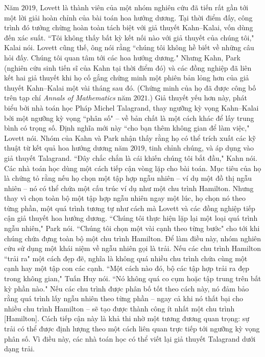 \begin{multicols}{2}
	\vskip 0.1cm
	Năm $2019$, Lovett là thành viên của một nhóm nghiên cứu đã tiến rất gần tới một lời giải hoàn chỉnh của bài toán hoa hướng dương. Tại thời điểm đấy, công trình đó tưởng chừng hoàn toàn tách biệt với giả thuyết Kahn--Kalai, vốn dùng đến xác suất. ``Tôi không thấy bất kỳ kết nối nào với giả thuyết của chúng tôi," Kalai nói. Lovett cũng thế, ông nói rằng ``chúng tôi không hề biết về những câu hỏi đấy. Chúng tôi quan tâm tới các hoa hướng dương."
	Nhưng Kahn, Park (nghiên cứu sinh tiến sĩ của Kahn tại thời điểm đó) và các đồng nghiệp đã liên kết hai giả thuyết khi họ cố gắng chứng minh một phiên bản lỏng hơn của giả thuyết Kahn--Kalai một vài tháng sau đó. (Chứng minh của họ đã được công bố trên tạp chí \textit{ Annals of Mathematics} năm $2021$.) Giả thuyết yếu hơn này, phát biểu bởi nhà toán học Pháp Michel Talagrand, thay ngưỡng kỳ vọng Kahn--Kalai bởi một ngưỡng kỳ vọng ``phân số" -- về bản chất là một cách khác để lấy trung bình có trọng số. Định nghĩa mới này ``cho bạn thêm không gian để làm việc," Lovett nói.
	\vskip 0.1cm
	Nhóm của Kahn và Park nhận thấy rằng họ có thể trích xuất các kỹ thuật từ kết quả hoa hướng dương năm $2019$, tinh chỉnh chúng, và áp dụng vào giả thuyết Talagrand. ``Đây chắc chắn là cái khiến chúng tôi bắt đầu," Kahn nói.
	\vskip 0.1cm
	Các nhà toán học dùng một cách tiếp cận vòng lặp cho bài toán.  Mục tiêu của họ là chứng tỏ rằng  nếu họ chọn một tập hợp ngẫu nhiên -- ví dụ một đồ thị ngẫu nhiên -- nó có thể chứa một cấu trúc ví dụ như một chu trình Hamilton. Nhưng thay vì chọn toàn bộ một tập hợp ngẫu nhiên ngay một lúc, họ chọn nó theo từng phần, một quá trình tương tự như cách mà Lovett và các đồng nghiệp tiếp cận giả thuyết hoa hướng dương. ``Chúng tôi thực hiện lặp lại một loại quá trình ngẫu nhiên," Park nói. ``Chúng tôi chọn một vài cạnh theo từng bước" cho tới khi chúng chứa đựng toàn bộ một chu trình Hamilton.
	\vskip 0.1cm
	Để làm điều này, nhóm nghiên cứu sử dụng một khái niệm về ngẫu nhiên gọi là trải. Nếu các chu trình Hamilton ``trải ra"  một cách đẹp đẽ, nghĩa là không quá nhiều chu trình chứa cùng một cạnh hay một tập con các cạnh. ``Một cách nào đó, bộ các tập hợp trải ra đẹp trong không gian," Tuấn Huy nói. ``Nó không quá co cụm hoặc tập trung trên bất kỳ phần nào." Nếu các chu trình được phân bố tốt theo cách này, nó đảm bảo rằng quá trình lấy ngẫu nhiên theo từng phần -- ngay cả khi nó thất bại cho nhiều chu trình Hamilton -- sẽ tạo được thành công ít nhất một chu trình [Hamilton].
	\vskip 0.1cm
	Cách tiếp cận này là khả thi nhờ một tương đương quan trọng:  sự trải có thể được định lượng theo một cách liên quan trực tiếp tới ngưỡng kỳ vọng phân số. Vì điều này, các nhà toán học có thể viết lại giả thuyết Talagrand dưới dạng trải.

\end{multicols}
